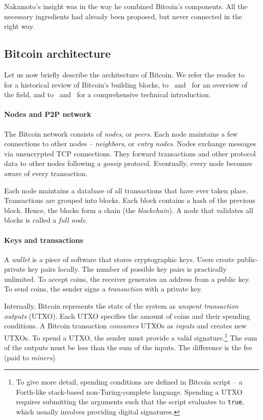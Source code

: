 Nakamoto's insight was in the way he combined Bitcoin's components.
All the necessary ingredients had already been proposed, but never connected in the right way.


\subsection{Bitcoin architecture}

Let us now briefly describe the architecture of Bitcoin.
We refer the reader to~\cite{Narayanan2017} for a historical review of Bitcoin's building blocks, to~\cite{Bonneau2015} and~\cite{Tschorsch2016} for an overview of the field, and to~\cite{Narayanan2016} and~\cite{Antonopoulos2014} for a comprehensive technical introduction.

\paragraph{Nodes and P2P network}

The Bitcoin network consists of \textit{nodes}, or \textit{peers}.
Each node maintains a few connections to other nodes -- \textit{neighbors}, or \textit{entry nodes}.
Nodes exchange messages via unencrypted TCP connections.
They forward transactions and other protocol data to other nodes following a \textit{gossip} protocol.
Eventually, every node becomes aware of every transaction.

Each node maintains a database of all transactions that have ever taken place.
Transactions are grouped into blocks.
Each block contains a hash of the previous block.
Hence, the blocks form a chain (the \textit{blockchain}).
A node that validates all blocks is called a \textit{full node}.

\paragraph{Keys and transactions}

A \textit{wallet} is a piece of software that stores cryptographic keys.
Users create public-private key pairs locally.
The number of possible key pairs is practically unlimited.
To accept coins, the receiver generates an address from a public key.
To send coins, the sender signs a \textit{transaction} with a private key.

Internally, Bitcoin represents the state of the system as \textit{unspent transaction outputs} (UTXO).
Each UTXO specifies the amount of coins and their spending conditions.
A Bitcoin transaction \textit{consumes} UTXOs as \textit{inputs} and creates new UTXOs.
To spend a UTXO, the sender must provide a valid signature.\footnote{To give more detail, spending conditions are defined in Bitcoin script -- a Forth-like stack-based non-Turing-complete language.
Spending a UTXO requires submitting the arguments such that the script evaluates to \texttt{true}, which usually involves providing digital signatures.}
The sum of the outputs must be less than the sum of the inputs.
The difference is the fee (paid to \textit{miners}).

